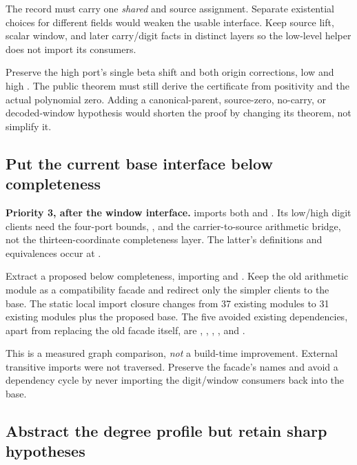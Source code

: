 The record must carry one \emph{shared}  and source assignment.
Separate existential choices for different fields would weaken the usable
interface. Keep source lift, scalar window, and later carry/digit facts in
distinct layers so the low-level helper does not import its consumers.

\risk{} Preserve the high port's single beta shift and both origin
corrections, low  and high . The public theorem must still
derive the certificate from positivity and the actual polynomial zero.
Adding a canonical-parent, source-zero, no-carry, or decoded-window
hypothesis would shorten the proof by changing its theorem, not simplify it.

\subsection{Put the current base interface below completeness}

\textbf{Priority 3, after the window interface.}
 imports both
 and . Its low/high
digit clients need the four-port bounds, , and the
carrier-to-source arithmetic bridge, not the thirteen-coordinate completeness
layer. The latter's definitions and equivalences occur at
.

Extract a proposed  below completeness,
importing  and . Keep the old
arithmetic module as a compatibility facade and redirect only the simpler
clients to the base. The static local import closure changes from 37 existing
modules to 31 existing modules plus the proposed base. The five avoided
existing dependencies, apart from replacing the old facade itself, are
, ,
, , and
.

This is a measured graph comparison, \emph{not} a build-time improvement.
External transitive imports were not traversed. Preserve the facade's names
and avoid a dependency cycle by never importing the digit/window consumers
back into the base.

\subsection{Abstract the degree profile but retain sharp hypotheses}
\label{sec:profiles}

